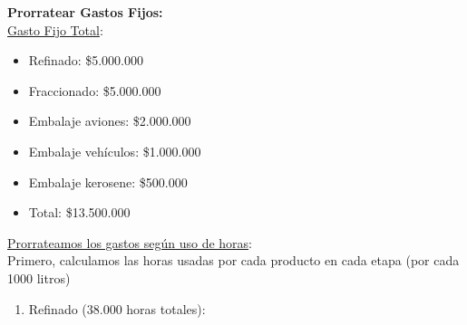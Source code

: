 \documentclass[10pt,a4paper]{article}
\begin{document}
\begin{enumerate}[label=\textbf{\sffamily\large\arabic*.}]
    \vspace{1em}

    \textbf{Prorratear Gastos Fijos:} \\

    \underline{Gasto Fijo Total}:

    \begin{itemize}

        \item Refinado: \$5.000.000
        \item Fraccionado: \$5.000.000
        \item Embalaje aviones: \$2.000.000
        \item Embalaje vehículos: \$1.000.000
        \item Embalaje kerosene: \$500.000 \\
        \item Total: \$13.500.000 \\

    \end{itemize}

    \underline{Prorrateamos los gastos según uso de horas}: \\

    Primero, calculamos las horas usadas por cada producto en cada etapa (por cada 1000 litros)

    \begin{center}
    \end{center}

    \clearpage

    \begin{enumerate}[label=\alph*)]

        \item Refinado (38.000 horas totales):
        

\end{enumerate}
\end{enumerate}
\end{document}
